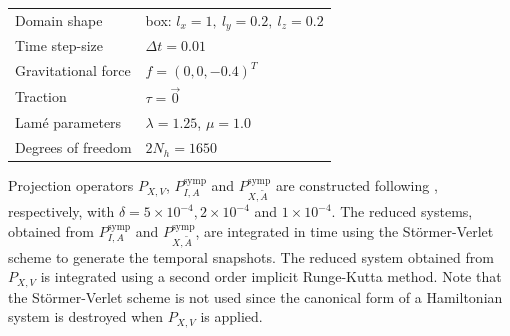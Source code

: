 \vspace{0.5cm}
\begin{center}
\begin{tabular}{|l|l|}
\hline
Domain shape & box: $l_x = 1,\ l_y = 0.2,\ l_z = 0.2$ \\
Time step-size & $\Delta t = 0.01$ \\
Gravitational force & $f = (0,0,-0.4)^T$ \\
Traction & $\tau = \vec 0$ \\
Lam\'e parameters & $\lambda = 1.25$, $\mu = 1.0$ \\
Degrees of freedom & $2N_{h} = 1650$ \\
\hline
\end{tabular}
\end{center}
\vspace{0.5cm}
Projection operators $P_{X,V}$, $P^{\text{symp}}_{I,A}$ and $P^{\text{symp}}_{X,\tilde A}$ are constructed following , respectively, with $\delta = 5\times 10^{-4}, 2\times 10^{-4}$ and $1\times 10^{-4}$. The reduced systems, obtained from $P^{\text{symp}}_{I,A}$ and $P^{\text{symp}}_{X,\tilde A}$, are integrated in time using the St\"ormer-Verlet scheme to generate the temporal snapshots. The reduced system obtained from $P_{X,V}$ is integrated using a second order implicit Runge-Kutta method. Note that the St\"ormer-Verlet scheme is not used since the canonical form of a Hamiltonian system is destroyed when $P_{X,V}$ is applied.

